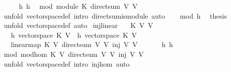 \begin{isabellebody}
%
\isadelimproof
%
\endisadelimproof
%
\isatagproof
{}\isamarkupfalse%
\ {\isacharminus}\isanewline
\ \ \isamarkupfalse%
\ h{}\ h{}\ \isamarkupfalse%
\ mod{\isacharcolon}\ {\isachardoublequoteopen}module\ K\ {\isacharparenleft}direct{\isacharunderscore}sum\ V{}\ V{}{\isacharparenright}{\isachardoublequoteclose}\ \isamarkupfalse%
\ {\isacharparenleft}unfold\ vectorspace{\isacharunderscore}def{\isacharcomma}\ intro\ direct{\isacharunderscore}sum{\isacharunderscore}is{\isacharunderscore}module{\isacharcomma}\ auto{\isacharparenright}\isanewline
\ \ \isamarkupfalse%
\ mod\ h{}\ \isamarkupfalse%
\ {\isacharquery}thesis\ \isamarkupfalse%
\ {\isacharparenleft}unfold\ vectorspace{\isacharunderscore}def{\isacharcomma}\ auto{\isacharparenright}\isanewline
{}\isamarkupfalse%
%
\endisatagproof
{\isafoldproof}%
%
\isadelimproof
\isanewline
%
\endisadelimproof
\isanewline
{}\isamarkupfalse%
\ inj{}{\isacharunderscore}linear{\isacharcolon}\isanewline
\ \ \ K\ V{}\ V{}\isanewline
\ \ \ h{}{\isacharcolon}\ {\isachardoublequoteopen}vectorspace\ K\ V{}{\isachardoublequoteclose}\ \ h{}{\isacharcolon}\ {\isachardoublequoteopen}vectorspace\ K\ V{}{\isachardoublequoteclose}\isanewline
\ \ \ {\isachardoublequoteopen}linear{\isacharunderscore}map\ K\ V{}\ {\isacharparenleft}direct{\isacharunderscore}sum\ V{}\ V{}{\isacharparenright}\ {\isacharparenleft}inj{}\ V{}\ V{}{\isacharparenright}{\isachardoublequoteclose}\isanewline
%
\isadelimproof
%
\endisadelimproof
%
\isatagproof
{}\isamarkupfalse%
\ {\isacharminus}\ \isanewline
\ \ \isamarkupfalse%
\ h{}\ h{}\ \isamarkupfalse%
\ mod{\isacharcolon}\ {\isachardoublequoteopen}mod{\isacharunderscore}hom\ K\ V{}\ {\isacharparenleft}direct{\isacharunderscore}sum\ V{}\ V{}{\isacharparenright}\ {\isacharparenleft}inj{}\ V{}\ V{}{\isacharparenright}{\isachardoublequoteclose}\ \isamarkupfalse%
\ {\isacharparenleft}unfold\ vectorspace{\isacharunderscore}def{\isacharcomma}\ intro\ inj{}{\isacharunderscore}hom{\isacharcomma}\ auto{\isacharparenright}\isanewline

\end{isabellebody}
